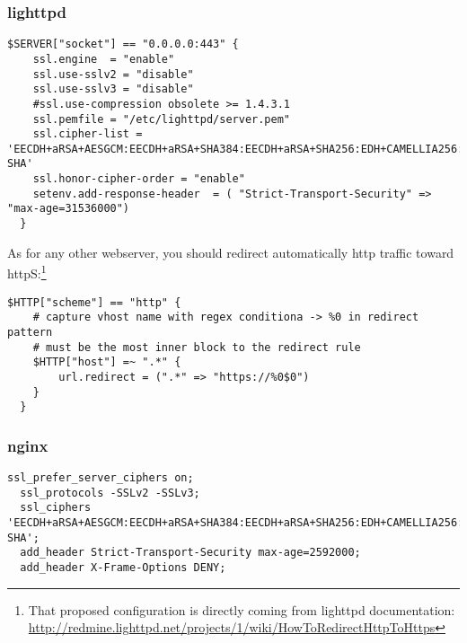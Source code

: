 \subsubsection{lighttpd}





\begin{lstlisting}[breaklines]
  $SERVER["socket"] == "0.0.0.0:443" {
    ssl.engine  = "enable"
    ssl.use-sslv2 = "disable"
    ssl.use-sslv3 = "disable"
    #ssl.use-compression obsolete >= 1.4.3.1
    ssl.pemfile = "/etc/lighttpd/server.pem"
    ssl.cipher-list = 'EECDH+aRSA+AESGCM:EECDH+aRSA+SHA384:EECDH+aRSA+SHA256:EDH+CAMELLIA256:EECDH:EDH+aRSA:+SSLv3:!aNULL:!eNULL:!LOW:!3DES:!MD5:!EXP:!PSK:!SRP:!DSS:!RC4:!SEED:!AES128:!CAMELLIA128:!ECDSA:AES256-SHA'
    ssl.honor-cipher-order = "enable"
    setenv.add-response-header  = ( "Strict-Transport-Security" => "max-age=31536000")
  }
\end{lstlisting}

As for any other webserver, you should redirect automatically http traffic toward httpS:\footnote{That proposed configuration is directly coming from lighttpd documentation: \url{http://redmine.lighttpd.net/projects/1/wiki/HowToRedirectHttpToHttps}}

\begin{lstlisting}[breaklines]
  $HTTP["scheme"] == "http" {
    # capture vhost name with regex conditiona -> %0 in redirect pattern
    # must be the most inner block to the redirect rule
    $HTTP["host"] =~ ".*" {
        url.redirect = (".*" => "https://%0$0")
    }
  }
\end{lstlisting}

\subsubsection{nginx}



\begin{lstlisting}[breaklines]
  ssl_prefer_server_ciphers on;
  ssl_protocols -SSLv2 -SSLv3; 
  ssl_ciphers 'EECDH+aRSA+AESGCM:EECDH+aRSA+SHA384:EECDH+aRSA+SHA256:EDH+CAMELLIA256:EECDH:EDH+aRSA:+SSLv3:!aNULL:!eNULL:!LOW:!3DES:!MD5:!EXP:!PSK:!SRP:!DSS:!RC4:!SEED:!AES128:!CAMELLIA128:!ECDSA:AES256-SHA';
  add_header Strict-Transport-Security max-age=2592000;
  add_header X-Frame-Options DENY;
\end{lstlisting}

